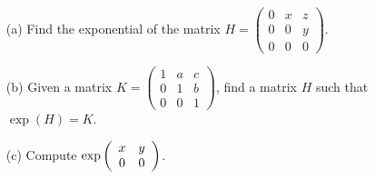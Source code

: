 \documentclass[12pt]{article}
\begin{document}
\begin{question}
\begin{enumerate}
\item[(a)] Find the exponential of the matrix $H=\left(\begin{array}{ccc}0 & x & z\\ 0 & 0 & y \\ 0 & 0 & 0\end{array}\right)$.
\item[(b)] Given a matrix $K=\left(\begin{array}{ccc}1 & a & c\\ 0 & 1 & b \\ 0 & 0 & 1\end{array}\right)$, find a matrix $H$ such that $\exp(H)=K$.
\item[(c)] Compute $\exp\left(\begin{array}{cc}x & y\\ 0 & 0\end{array}\right)$.
\end{enumerate}
\end{question}

\iffalse
\begin{answer}
\begin{enumerate}[(a)]
\item \begin{align*}
\exp(H)&=\matt{1}{0}{0}{0}{1}{0}{0}{0}{1}+\matt{0}{x}{z}{0}{0}{y}{0}{0}{0}+\frac{1}{2!}\matt{0}{0}{xy}{0}{0}{0}{0}{0}{0}\\
       &=\matt{1}{x}{z+\frac{xy}{2}}{0}{1}{y}{0}{0}{1}
\end{align*}
\item We want to solve
\[\matt{1}{x}{z+\frac{xy}{2}}{0}{1}{y}{0}{0}{1}=\matt{1}{a}{c}{0}{1}{b}{0}{0}{1}\]
for $x,y,z$ so $x=a$, $y=b$ and $z=c-\frac{ab}{2}$, so we see
\[\exp\matt{0}{a}{c-\frac{ab}{2}}{0}{0}{b}{0}{0}{0}=\matt{1}{a}{c}{0}{1}{b}{0}{0}{1}.\]
\item We have
\[\matr{x}{y}{0}{0}^n=\matr{x^n}{x^{n-1}y}{0}{0}\]
so
\[\exp\matr{x}{y}{0}{0}=\matr{1}{0}{0}{1}+\sum_{n=1}^{\infty}\frac{1}{n!}\matr{x^n}{x^{n-1}y}{0}{0}\]
This gives
\[\exp\matr{x}{y}{0}{0}=\matr{e^x}{\frac{e^x-1}{x}y}{0}{1}.\]
\end{enumerate}
\end{answer}
\newpage
\fi

\bigskip
\end{document}
